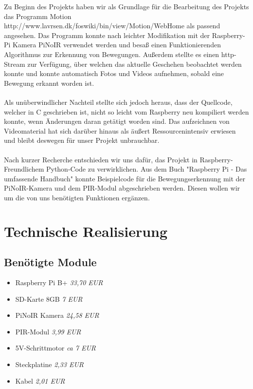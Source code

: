 \documentclass[12pt,a4paper]{scrreprt}
\begin{document}
Zu Beginn des Projekts haben wir als Grundlage für die Bearbeitung des Projekts das Programm Motion http://www.lavrsen.dk/foswiki/bin/view/Motion/WebHome als passend angesehen. Das Programm konnte nach leichter Modifikation mit der Raspberry-Pi Kamera PiNoIR verwendet werden und besaß einen Funktionierenden Algorithmus zur Erkennung von Bewegungen. Außerdem stellte es einen http-Stream zur Verfügung, über welchen das aktuelle Geschehen beobachtet werden konnte und konnte automatisch Fotos und Videos aufnehmen, sobald eine Bewegung erkannt worden ist. 
\\ \\
Als unüberwindlicher Nachteil stellte sich jedoch heraus, dass der Quellcode, welcher in C geschrieben ist, nicht so leicht vom Raspberry neu kompiliert werden konnte, wenn Änderungen daran getätigt worden sind. Das aufzeichnen von Videomaterial hat sich darüber hinaus als äußert Ressourcenintensiv erwiesen und bleibt deswegen für unser Projekt unbrauchbar.
\\ \\
Nach kurzer Recherche entschieden wir uns dafür, das Projekt in Raspberry-Freundlichem Python-Code zu verwirklichen.
Aus dem Buch "Raspberry Pi - Das umfassende Handbuch" konnte Beispielcode für die Bewegungserkennung mit der PiNoIR-Kamera und dem PIR-Modul abgeschrieben werden.
Diesen wollen wir um die von uns benötigten Funktionen ergänzen.

\chapter{Technische Realisierung}
\section{Benötigte Module}
\begin{itemize}
\item Raspberry Pi B+ \textit{33,70 EUR} 
\item SD-Karte 8GB \textit{7 EUR}
\item PiNoIR Kamera \textit{24,58 EUR}
\item PIR-Modul \textit{3,99 EUR}
\item 5V-Schrittmotor \textit{ca 7 EUR}
\item Steckplatine \textit{2,33 EUR}
\item Kabel \textit{2,01 EUR}
\end{itemize}
\end{document}
